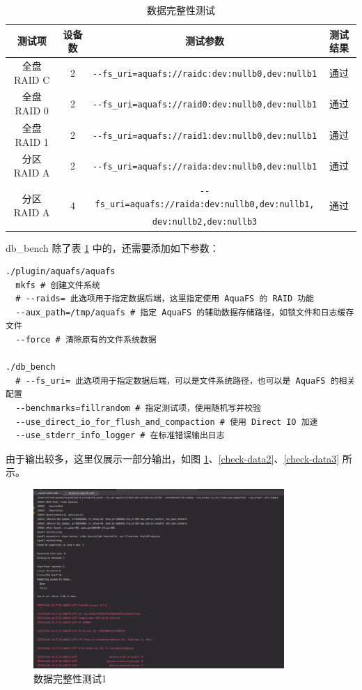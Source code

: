 \begin{table}[htbp]
  \centering
  \caption{数据完整性测试}
  \label{test-data}
  \begin{tabular}{cccc}
    \hline
    \textbf{测试项} & \textbf{设备数} & \textbf{测试参数} & \textbf{测试结果} \\
    \hline
    全盘 RAID C & 2 & \verb|--fs_uri=aquafs://raidc:dev:nullb0,dev:nullb1| & 通过 \\
    全盘 RAID 0 & 2 & \verb|--fs_uri=aquafs://raid0:dev:nullb0,dev:nullb1| & 通过 \\
    全盘 RAID 1 & 2 & \verb|--fs_uri=aquafs://raid1:dev:nullb0,dev:nullb1| & 通过 \\
    分区 RAID A & 2 & \verb|--fs_uri=aquafs://raida:dev:nullb0,dev:nullb1| & 通过 \\
    \multirow{2}{*}{分区 RAID A} & \multirow{2}{*}{4} & \verb|--fs_uri=aquafs://raida:dev:nullb0,dev:nullb1,| & \multirow{2}{*}{通过} \\
    & & \verb|dev:nullb2,dev:nullb3| & \\
    \hline
  \end{tabular}
\end{table}

db\_bench 除了表 \ref{test-data} 中的，还需要添加如下参数：

\begin{lstlisting}
./plugin/aquafs/aquafs
  mkfs # 创建文件系统
  # --raids= 此选项用于指定数据后端，这里指定使用 AquaFS 的 RAID 功能
  --aux_path=/tmp/aquafs # 指定 AquaFS 的辅助数据存储路径，如锁文件和日志缓存文件
  --force # 清除原有的文件系统数据

./db_bench 
  # --fs_uri= 此选项用于指定数据后端，可以是文件系统路径，也可以是 AquaFS 的相关配置
  --benchmarks=fillrandom # 指定测试项，使用随机写并校验
  --use_direct_io_for_flush_and_compaction # 使用 Direct IO 加速
  --use_stderr_info_logger # 在标准错误输出日志
\end{lstlisting}

由于输出较多，这里仅展示一部分输出，如图 \ref{check-data1}、\ref{check-data2}、\ref{check-data3} 所示。

\begin{figure}[htbp]
  \centering
  \includegraphics[width=0.85\textwidth]{fig/raid-data-check1}
  \caption{ 数据完整性测试1 }
  \label{check-data1}
\end{figure}

